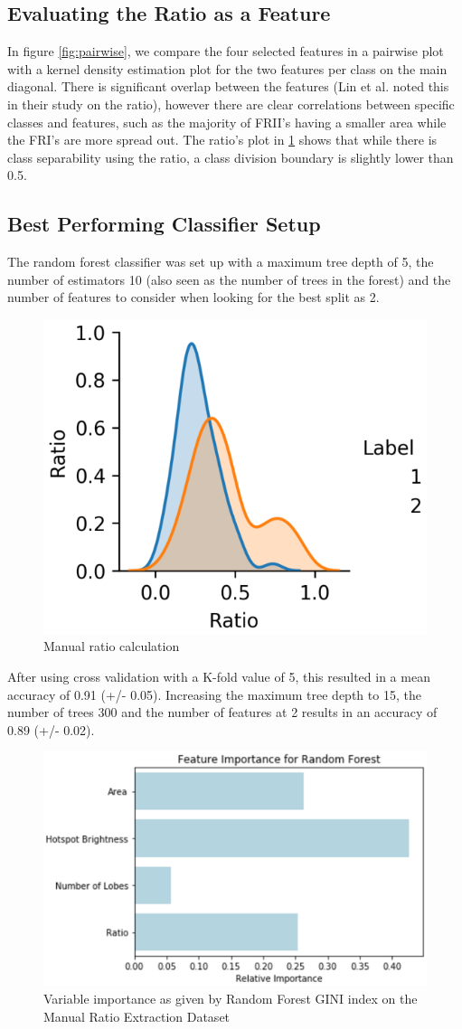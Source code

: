\documentclass[conference]{IEEEtran}
\begin{document}
\subsection{Evaluating the Ratio as a Feature}

In figure \ref{fig:pairwise}, we compare the four selected features in a pairwise plot with a kernel density estimation plot for the two features per class on the main diagonal. There is significant overlap between the features (Lin et al. \cite{lin_2010} noted this in their study on the ratio), however there are clear correlations between specific classes and features, such as the majority of FRII's having a smaller area while the FRI's are more spread out. The ratio's plot in \ref{fig:ratio_plot} shows that while there is class separability using the ratio, a class division boundary is slightly lower than 0.5. 

\subsection{Best Performing Classifier Setup}

The random forest classifier was set up with a maximum tree depth of 5, the number of estimators 10 (also seen as the number of trees in the forest) and the number of features to consider when looking for the best split as 2.

\begin{figure}[ht]
    \centering
    \includegraphics[width=0.3 \textwidth]{EPS/ratio.eps}
    \caption{Manual ratio calculation}
    \label{fig:ratio_plot}
\end{figure}

After using cross validation with a K-fold value of 5, this resulted in a mean accuracy of 0.91 (+/- 0.05). Increasing the maximum tree depth to 15, the number of trees 300 and the number of features at 2 results in an accuracy of 0.89 (+/- 0.02).

\begin{figure}[ht]
    \centering
    \includegraphics[width=0.5 \textwidth]{EPS/feature_import.eps}
    \caption{Variable importance as given by Random Forest GINI index on the Manual Ratio Extraction Dataset}
    \label{fig:gini}
\end{figure}
\end{document}

